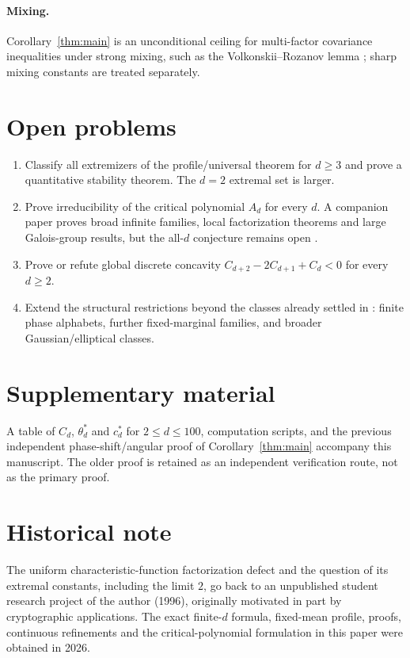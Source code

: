 \documentclass[11pt]{article}
\theoremstyle{definition}\newtheorem{definition}[theorem]{Definition}
\theoremstyle{remark}\newtheorem{remark}[theorem]{Remark}
\begin{document}
\paragraph{Mixing.} Corollary~\ref{thm:main} is an unconditional ceiling for multi-factor covariance inequalities under
strong mixing, such as the Volkonskii--Rozanov lemma \cite{VolkonskiiRozanov1959}; sharp mixing constants are treated
separately.

\section{Open problems}
\begin{enumerate}
\item Classify all extremizers of the profile/universal theorem for $d\ge3$ and prove a quantitative stability theorem.
The $d=2$ extremal set is larger.
\item Prove irreducibility of the critical polynomial $A_d$ for every $d$. A companion paper proves broad infinite families, local factorization theorems and large Galois-group results, but the all-$d$ conjecture remains open \cite{MartinevskiCritical}.
\item Prove or refute global discrete concavity $C_{d+2}-2C_{d+1}+C_d<0$ for every $d\ge2$.
\item Extend the structural restrictions beyond the classes already settled in \cite{MartinevskiMarginals}: finite phase alphabets, further fixed-marginal families, and broader Gaussian/elliptical classes.
\end{enumerate}

\section*{Supplementary material}
A table of $C_d$, $\theta_d^*$ and $c_d^*$ for $2\le d\le100$, computation scripts, and the previous independent
phase-shift/angular proof of Corollary~\ref{thm:main} accompany this manuscript. The older proof is retained as an
independent verification route, not as the primary proof.

\section*{Historical note}
The uniform characteristic-function factorization defect and the question of its extremal constants, including the
limit $2$, go back to an unpublished student research project of the author (1996), originally motivated in part by
cryptographic applications. The exact finite-$d$ formula, fixed-mean profile, proofs, continuous refinements and the
critical-polynomial formulation in this paper were obtained in 2026.
\end{document}
